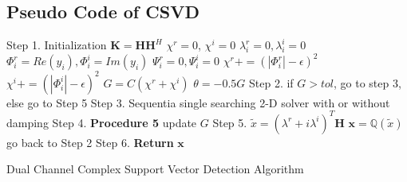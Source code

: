 \documentclass[12pt, draftclsnofoot, onecolumn]{IEEEtran}
\begin{document}
\begin{spacing}{2}
\section{Pseudo Code of CSVD}\label{Pseudo code of CSVD}
\begin{algorithm}[htb]
\begin{algorithmic}
\State Step 1. Initialization
\State $\mathbf{K}=\mathbf{H}\mathbf{H}^{H}$ 
\State $\chi^{r}=0$, $\chi^{i}=0$ 
\State $\lambda_{i}^{r}=0, \lambda_{i}^{i}=0$
\State $\Phi_{i}^{r}=Re(y_{i}), \Phi_{i}^{i}=Im(y_{i})$
\State $\Psi_{i}^{r}=0, \Psi_{i}^{i}=0$
\State $\chi^{r}+=(|\Phi^{r}_{i}|-\epsilon)^{2}$
\EndIf
{}
\State $\chi^{i}+=(|\Phi_{i}^{i}|-\epsilon)^{2}$
\EndIf
\EndFor 
\State $G=C(\chi^{r}+\chi^{i})$ 
\State $\theta=-0.5G$ 
\State  Step 2. if $G>tol$, go to step 3, else go to Step 5
\State Step 3.
\State Sequentia single searching 2-D solver with or without damping  
\State Step 4. \textbf{Procedure 5} update $G$
\State Step 5.
\State $\tilde{x}=(\lambda^{r}+i\lambda^{i})^{T}\mathbf{H}$ 
\State $\mathbf{x}=\mathbb{Q}(\tilde{x})$
\State go back to Step 2
\State Step 6. \textbf{Return} $\mathbf{x}$ 

\EndProcedure
\end{algorithmic}
\label{CSVD algorithm}
\caption{Dual Channel Complex Support Vector Detection Algorithm }
\end{algorithm}






\ifCLASSOPTIONcaptionsoff
  \newpage
\fi




\end{spacing}
\end{document}
